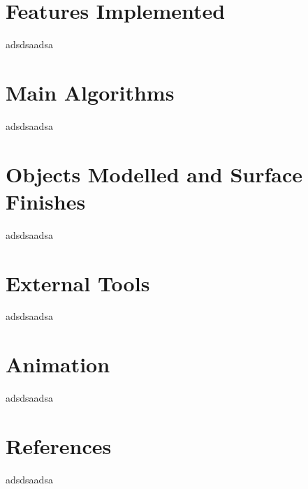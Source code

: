 \documentclass[]{article}
\begin{document}
\section*{Features Implemented}
adsdsaadsa


\section*{Main Algorithms}
adsdsaadsa


\section*{Objects Modelled and Surface Finishes}
adsdsaadsa


\section*{External Tools}
adsdsaadsa


\section*{Animation}
adsdsaadsa


\section*{References}
adsdsaadsa

\end{document}

